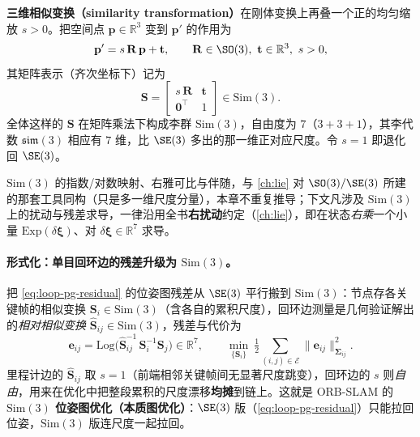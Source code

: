 \begin{definition}\label{def:loop-sim3}
\textbf{三维相似变换（similarity transformation）}在刚体变换上再叠一个正的均匀缩放 $s>0$。把空间点 $\mathbf p\in\mathbb R^3$ 变到 $\mathbf p'$ 的作用为
\begin{equation}
  \mathbf p' = s\,\mathbf R\,\mathbf p + \mathbf t,\qquad \mathbf R\in\SO(3),\ \mathbf t\in\mathbb R^3,\ s>0,
  \label{eq:loop-sim3-action}
\end{equation}
其矩阵表示（齐次坐标下）记为
\begin{equation}
  \mathbf S=\begin{bmatrix} s\,\mathbf R & \mathbf t\\ \mathbf 0^\top & 1\end{bmatrix}\in\mathrm{Sim}(3).
  \label{eq:loop-sim3-mat}
\end{equation}
全体这样的 $\mathbf S$ 在矩阵乘法下构成李群 $\mathrm{Sim}(3)$，自由度为 $7$（$3+3+1$），其李代数 $\mathfrak{sim}(3)$ 相应有 $7$ 维，比 $\SE(3)$ 多出的那一维正对应尺度。令 $s=1$ 即退化回 $\SE(3)$。
\end{definition}

\noindent$\mathrm{Sim}(3)$ 的指数/对数映射、右雅可比与伴随，与 \cref{ch:lie} 对 $\SO(3)/\SE(3)$ 所建的那套工具同构（只是多一维尺度分量），本章不重复推导；下文凡涉及 $\mathrm{Sim}(3)$ 上的扰动与残差求导，一律沿用全书\textbf{右扰动}约定（\cref{ch:lie}），即在状态\emph{右乘}一个小量 $\mathrm{Exp}(\delta\boldsymbol\xi)$、对 $\delta\boldsymbol\xi\in\mathbb R^7$ 求导。

\paragraph{形式化：单目回环边的残差升级为 \texorpdfstring{$\mathrm{Sim}(3)$}{Sim(3)}。}
把 \cref{eq:loop-pg-residual} 的位姿图残差从 $\SE(3)$ 平行搬到 $\mathrm{Sim}(3)$：节点存各关键帧的相似变换 $\mathbf S_i\in\mathrm{Sim}(3)$（含各自的累积尺度），回环边测量是几何验证解出的\emph{相对相似变换} $\hat{\mathbf S}_{ij}\in\mathrm{Sim}(3)$，残差与代价为
\begin{equation}
  \mathbf e_{ij}=\mathrm{Log}\!\big(\hat{\mathbf S}_{ij}^{-1}\,\mathbf S_i^{-1}\mathbf S_j\big)\in\mathbb R^{7},\qquad
  \min_{\{\mathbf S_i\}}\ \tfrac12\!\!\sum_{(i,j)\in\mathcal E}\!\!\lVert\mathbf e_{ij}\rVert_{\boldsymbol\Sigma_{ij}}^2 .
  \label{eq:loop-sim3-residual}
\end{equation}
里程计边的 $\hat{\mathbf S}_{ij}$ 取 $s=1$（前端相邻关键帧间无显著尺度跳变），回环边的 $s$ 则\emph{自由}，用来在优化中把整段累积的尺度漂移\textbf{均摊}到链上。这就是 ORB-SLAM 的 \textbf{$\mathrm{Sim}(3)$ 位姿图优化（本质图优化）}\cite{murartal2015orbslam}：$\SE(3)$ 版（\cref{eq:loop-pg-residual}）只能拉回位姿，$\mathrm{Sim}(3)$ 版连尺度一起拉回。

